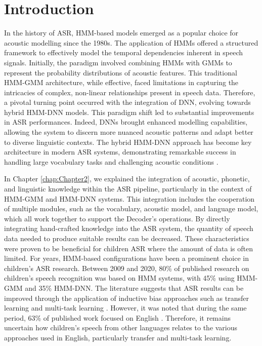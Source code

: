 \label{chap:Chapter3}
\cleardoublepage
\section{Introduction}

In the history of \ac{ASR}, \ac{HMM}-based models emerged as a popular choice for acoustic modelling since the 1980s. The application of \acp{HMM} offered a structured framework to effectively model the temporal dependencies inherent in speech signals. Initially, the paradigm involved combining \acp{HMM} with \acp{GMM} to represent the probability distributions of acoustic features. This traditional \ac{HMM-GMM} architecture, while effective, faced limitations in capturing the intricacies of complex, non-linear relationships present in speech data. Therefore, a pivotal turning point occurred with the integration of \ac{DNN}, evolving towards hybrid \ac{HMM-DNN} models. This paradigm shift led to substantial improvements in \ac{ASR} performances. Indeed, \acp{DNN} brought enhanced modelling capabilities, allowing the system to discern more nuanced acoustic patterns and adapt better to diverse linguistic contexts. The hybrid \ac{HMM-DNN} approach has become key architecture in modern \ac{ASR} systems, demonstrating remarkable success in handling large vocabulary tasks and challenging acoustic conditions \cite{hmm-dnn}. 

In Chapter \ref{chap:Chapter2}, we explained the integration of acoustic, phonetic, and linguistic knowledge within the \ac{ASR} pipeline, particularly in the context of \ac{HMM-GMM} and \ac{HMM-DNN} systems. This integration includes the cooperation of multiple modules, such as the vocabulary, acoustic model, and language model, which all work together to support the Decoder's operations. By directly integrating hand-crafted knowledge into the \ac{ASR} system, the quantity of speech data needed to produce suitable results can be decreased. These characteristics were proven to be beneficial for children \ac{ASR} where the amount of data is often limited. For years, \ac{HMM}-based configurations have been a prominent choice in children's \ac{ASR} research. Between 2009 and 2020, 80\% of published research on children's speech recognition was based on \ac{HMM} systems, with 45\% using \ac{HMM-GMM} and 35\% \ac{HMM-DNN}. The literature suggests that \ac{ASR} results can be improved through the application of inductive bias approaches such as transfer learning and multi-task learning \cite{TransferLF}. However, it was noted that during the same period, 63\% of published work focused on English \cite{big_review_childASR}. Therefore, it remains uncertain how children's speech from other languages relates to the various approaches used in English, particularly transfer and multi-task learning.

